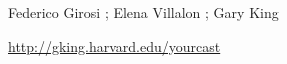 %
\begin{Author}\relax
Federico Girosi ; 
Elena Villalon ;
Gary King 
\end{Author}
%
\begin{References}\relax
\url{http://gking.harvard.edu/yourcast} 
\end{References}

